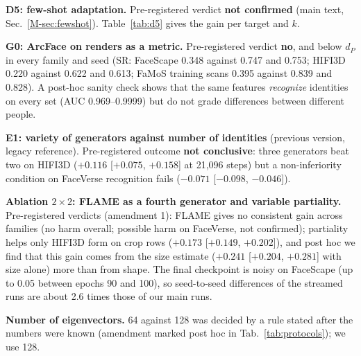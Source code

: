 \documentclass[10pt,twocolumn,letterpaper]{article}
\begin{document}
\textbf{D5: few-shot adaptation.} Pre-registered verdict \textbf{not confirmed} (main text, Sec.~\ref{M-sec:fewshot}). Table~\ref{tab:d5} gives the gain per target and $k$.

\begin{table}[t]
  \centering
  \scriptsize
  \caption{D5: gain of the adapted head over $d_P$ with SR (pre-registered equal-weight variant), per target and number $k$ of labelled target identities; 95\% intervals conditional on the draws. FLAME has a pool of 100: its $k=200$ column uses $k=100$.}
  \label{tab:d5}
  \resizebox{\textwidth}{!}{}
\end{table}

\textbf{G0: ArcFace on renders as a metric.} Pre-registered verdict \textbf{no}, and below $d_P$ in every family and seed (SR: FaceScape 0.348 against 0.747 and 0.753; HIFI3D 0.220 against 0.622 and 0.613; FaMoS training scans 0.395 against 0.839 and 0.828). A post-hoc sanity check shows that the same features \emph{recognize} identities on every set (AUC 0.969--0.9999) but do not grade differences between different people.

\textbf{E1: variety of generators against number of identities} (previous version, legacy reference). Pre-registered outcome \textbf{not conclusive}: three generators beat two on HIFI3D ($+0.116$ [$+0.075$, $+0.158$] at 21{,}096 steps) but a non-inferiority condition on FaceVerse recognition fails ($-0.071$ [$-0.098$, $-0.046$]).

\textbf{Ablation $2\times2$: FLAME as a fourth generator and variable partiality.} Pre-registered verdicts (amendment 1): FLAME gives no consistent gain across families (no harm overall; possible harm on FaceVerse, not confirmed); partiality helps only HIFI3D form on crop rows ($+0.173$ [$+0.149$, $+0.202$]), and post hoc we find that this gain comes from the size estimate ($+0.241$ [$+0.204$, $+0.281$] with size alone) more than from shape. The final checkpoint is noisy on FaceScape (up to 0.05 between epochs 90 and 100), so seed-to-seed differences of the streamed runs are about 2.6 times those of our main runs.

\textbf{Number of eigenvectors.} 64 against 128 was decided by a rule stated after the numbers were known (amendment marked post hoc in Tab.~\ref{tab:protocols}); we use 128.
\end{document}
